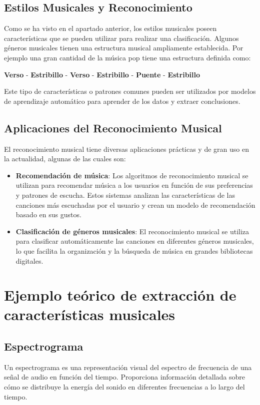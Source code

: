 \subsection{Estilos Musicales y Reconocimiento}
Como se ha visto en el apartado anterior, los estilos musicales poseen características que se pueden utilizar para realizar una clasificación.
Algunos géneros musicales tienen una estructura musical ampliamente establecida. Por ejemplo una gran cantidad de la música pop \cite{Team} tiene una estructura definida como:

\begin{center}
\hfill \textbf{Verso} - \hfill \textbf{Estribillo} - \hfill \textbf{Verso} - \hfill \textbf{Estribillo} - \hfill \textbf{Puente} - \hfill \textbf{Estribillo}
\end{center}

Este tipo de características o patrones comunes pueden ser utilizados por modelos de aprendizaje automático para aprender de los datos y extraer conclusiones.

\subsection{Aplicaciones del Reconocimiento Musical}
El reconocimiento musical tiene diversas aplicaciones prácticas y de gran uso en la actualidad, algunas de las cuales son:

\begin{itemize}
\item \textbf{Recomendación de música}: Los algoritmos de reconocimiento musical se utilizan para recomendar música a los usuarios en función de sus preferencias y patrones de escucha. 
Estos sistemas analizan las características de las canciones más escuchadas por el usuario y crean un modelo de recomendación basado en sus gustos.

\item \textbf{Clasificación de géneros musicales}: El reconocimiento musical se utiliza para clasificar automáticamente las canciones en diferentes géneros musicales, lo que facilita la organización y la búsqueda de música en grandes bibliotecas digitales.
\end{itemize}

\section{Ejemplo teórico de extracción de características musicales}

\subsection{Espectrograma}
Un espectrograma es una representación visual del espectro de frecuencia de una señal de audio en función del tiempo. 
Proporciona información detallada sobre cómo se distribuye la energía del sonido en diferentes frecuencias a lo largo del tiempo.

